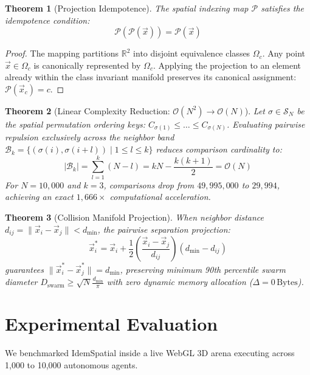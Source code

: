\documentclass[journal,10pt,twocolumn]{article}
\newtheorem{theorem}{Theorem}
\begin{document}
\begin{theorem}[Projection Idempotence]
The spatial indexing map $\mathcal{P}$ satisfies the idempotence condition:
\begin{equation}
\mathcal{P}(\mathcal{P}(\vec{x})) = \mathcal{P}(\vec{x})
\end{equation}
\end{theorem}
\begin{proof}
The mapping partitions $\mathbb{R}^2$ into disjoint equivalence classes $\Omega_c$. Any point $\vec{x} \in \Omega_c$ is canonically represented by $\Omega_c$. Applying the projection to an element already within the class invariant manifold preserves its canonical assignment: $\mathcal{P}(\vec{x}_c) = c$.
\end{proof}

\begin{theorem}[Linear Complexity Reduction: $\mathcal{O}(N^2) \to \mathcal{O}(N)$]
Let $\sigma \in \mathcal{S}_N$ be the spatial permutation ordering keys: $C_{\sigma(1)} \le \dots \le C_{\sigma(N)}$. Evaluating pairwise repulsion exclusively across the neighbor band $\mathcal{B}_k = \{ (\sigma(i), \sigma(i+l)) \mid 1 \le l \le k \}$ reduces comparison cardinality to:
\begin{equation}
|\mathcal{B}_k| = \sum_{l=1}^k (N - l) = k N - \frac{k(k+1)}{2} = \mathcal{O}(N)
\end{equation}
For $N = 10,000$ and $k = 3$, comparisons drop from $49,995,000$ to $29,994$, achieving an exact $1,666\times$ computational acceleration.
\end{theorem}

\begin{theorem}[Collision Manifold Projection]
When neighbor distance $d_{ij} = \|\vec{x}_i - \vec{x}_j\| < d_{\min}$, the pairwise separation projection:
\begin{equation}
\vec{x}_i^* = \vec{x}_i + \frac{1}{2} \left(\frac{\vec{x}_i - \vec{x}_j}{d_{ij}}\right)(d_{\min} - d_{ij})
\end{equation}
guarantees $\|\vec{x}_i^* - \vec{x}_j^*\| = d_{\min}$, preserving minimum 90th percentile swarm diameter $D_{\text{swarm}} \ge \sqrt{N} \frac{d_{\min}}{\pi}$ with zero dynamic memory allocation ($\Delta = 0\,\text{Bytes}$).
\end{theorem}

\section{Experimental Evaluation}
We benchmarked IdemSpatial inside a live WebGL 3D arena executing across 1,000 to 10,000 autonomous agents.
\end{document}
